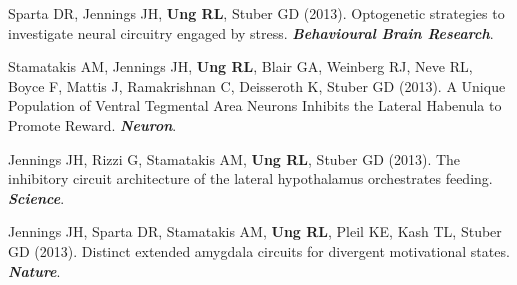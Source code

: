 \begin{etaremune}
  \item Sparta DR\textsuperscript{\textasteriskcentered}, Jennings JH\textsuperscript{\textasteriskcentered}, \textbf{Ung RL}, Stuber GD (2013). Optogenetic strategies to investigate neural circuitry engaged by stress. \textbf{\textit{Behavioural Brain Research}}.
  \item Stamatakis AM, Jennings JH, \textbf{Ung RL}, Blair GA, Weinberg RJ, Neve RL, Boyce F, Mattis J, Ramakrishnan C, Deisseroth K, Stuber GD (2013). A Unique Population of Ventral Tegmental Area Neurons Inhibits the Lateral Habenula to Promote Reward. \textbf{\textit{Neuron}}.
  \item Jennings JH, Rizzi G, Stamatakis AM, \textbf{Ung RL}, Stuber GD (2013). The inhibitory circuit architecture of the lateral hypothalamus orchestrates feeding. \textbf{\textit{Science}}.
  \item Jennings JH\textsuperscript{\textasteriskcentered}, Sparta DR\textsuperscript{\textasteriskcentered}, Stamatakis AM, \textbf{Ung RL}, Pleil KE, Kash TL, Stuber GD (2013). Distinct extended amygdala circuits for divergent motivational states. \textbf{\textit{Nature}}.
\end{etaremune}
